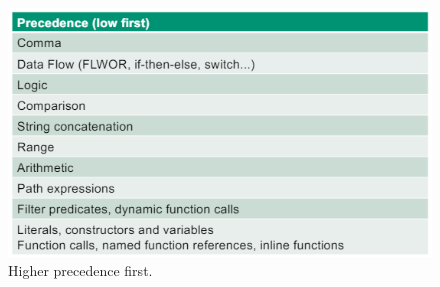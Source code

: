 \begin{figure}[h]
	\centering
	\includegraphics[scale=0.65]{images/5-precedence.PNG}
	\caption{Higher precedence first.}
	\label{fig:jsoniq_prec}
\end{figure}